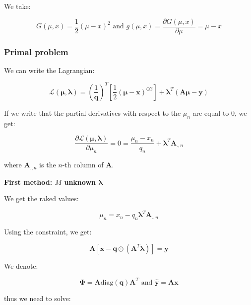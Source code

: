 \documentclass{tex/note}
\begin{document}
We take:

\begin{equation*}
G \left( \mu , x \right) = \frac{1}{2} \left( \mu - x \right) ^2 \text{ and } g \left( \mu , x \right) = \frac{\partial G \left( \mu , x \right)}{\partial \mu} = \mu - x
\end{equation*}

\subsubsection{Primal problem}

We can write the Lagrangian:

\begin{equation*}
\mathcal{L} \left( \bm{\mu} , \bm{\lambda} \right) = \left( \frac{1}{\bm{q}} \right)^T \left[ \frac{1}{2} \left( \bm{\mu} - \bm{x} \right)^{\odot 2} \right] + \bm{\lambda}^T \left( \bm{A} \bm{\mu} - \bm{y} \right)
\end{equation*}

If we write that the partial derivatives with respect to the $\mu_n$ are equal to $0$, we get:

\begin{equation*}
\frac{\partial \mathcal{L} \left( \bm{\mu} , \bm{\lambda} \right)}{\partial \mu_n} = 0 =
\frac{\mu_n - x_n}{q_n} + \bm{\lambda}^T \bm{A}_{.,n}
\end{equation*}

where $\bm{A}_{.,n}$ is the $n$-th column of $\bm{A}$.

\textbf{First method: $M$ unknown $\bm{\lambda}$}

We get the raked values:

\begin{equation*}
\mu_n = x_n - q_n \bm{\lambda}^T \bm{A}_{.,n}
\end{equation*}

Using the constraint, we get:

\begin{equation*}
\bm{A} \left[ \bm{x} - \bm{q} \odot \left( \bm{A}^T \bm{\lambda} \right) \right] = \bm{y}
\end{equation*}

We denote:

\begin{equation*}
\bm{\Phi} = \bm{A} \text{diag} \left( \bm{q} \right) \bm{A}^T  \text{ and } \hat{\bm{y}} = \bm{A} \bm{x}
\end{equation*}

thus we need to solve:
\end{document}
